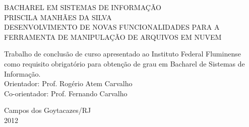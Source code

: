 \begin{titlepage}
 \begin{figure}[ht]
 \centering
 \end{figure}
 \begin{center}
   {\large BACHAREL EM SISTEMAS DE INFORMAÇÃO} \\ [3.5cm]
   {\large PRISCILA MANHÃES DA SILVA} \\ [4cm]
   {\large DESENVOLVIMENTO DE NOVAS FUNCIONALIDADES PARA A FERRAMENTA DE MANIPULAÇÃO DE ARQUIVOS EM NUVEM}\\ [2cm]
   \hspace{.45\textwidth} %
   \begin{minipage}{0.5\textwidth}
   \begin{espacosimples}
        Trabalho de conclusão de curso apresentado ao Instituto Federal Fluminense como requisito obrigatório para obtenção de grau em Bacharel de Sistemas de Informação.\\[1.5cm]
        Orientador: Prof. Rogério Atem Carvalho\\
        Co-orientador: Prof. Fernando Carvalho
    \end{espacosimples}
    \end{minipage}
   \vfill
   {\large Campos dos Goytacazes/RJ} \\
   {\large 2012}
 \end{center}
\end{titlepage}
